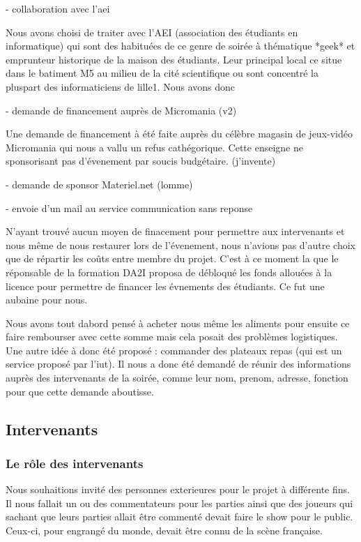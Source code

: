 - collaboration avec l'aei

  Nous avons choisi de traiter avec l'AEI (association des étudiants
  en informatique) qui sont des habituées de ce genre de soirée à
  thématique *geek* et emprunteur historique de la maison des étudiants.
  Leur principal local ce situe dans le batiment M5 au milieu de la
  cité scientifique ou sont concentré la pluspart des informaticiens de
  lille1.
  Nous avons donc

- demande de financement auprès de Micromania (v2)

  Une demande de financement à été faite auprès du célèbre magasin de
  jeux-vidéo Micromania qui nous a vallu un refus cathégorique. Cette
  enseigne ne sponsorisant pas d'évenement par soucis
  budgétaire. (j'invente)

- demande de sponsor Materiel.net (lomme)

- envoie d'un mail au service communication sans reponse

  N'ayant trouvé aucun moyen de finacement pour permettre aux
  intervenants et nous même de nous restaurer lors de l'évenement, nous
  n'avions pas d'autre choix que de répartir les coûts entre membre du
  projet. C'est à ce moment la que le réponsable de la formation DA2I
  proposa de débloqué les fonds allouées à la licence pour permettre de
  financer les évnements des étudiants. Ce fut une aubaine pour nous.

  Nous avons tout dabord pensé à acheter nous même les aliments pour
  ensuite ce faire rembourser avec cette somme mais cela posait des
  problèmes logistiques. Une autre idée à donc été proposé : commander des
  plateaux repas (qui est un service proposé par l'iut). Il nous a donc
  été demandé de réunir des informations auprès des intervenants de la
  soirée, comme leur nom, prenom, adresse, fonction pour que cette demande
  aboutisse.

\subsection{Intervenants}%
\label{sub:intervenants}

\subsubsection{Le rôle des intervenants}%
\label{ssub:le_role_des_intervenants}

Nous souhaitions invité des personnes exterieures pour le projet à
différente fins. Il nous fallait un ou des commentateurs pour les
parties ainsi que des joueurs qui sachant que leurs parties allait être
commenté devait faire le show pour le public. Ceux-ci, pour engrangé du
monde, devait être connu de la scène française.

